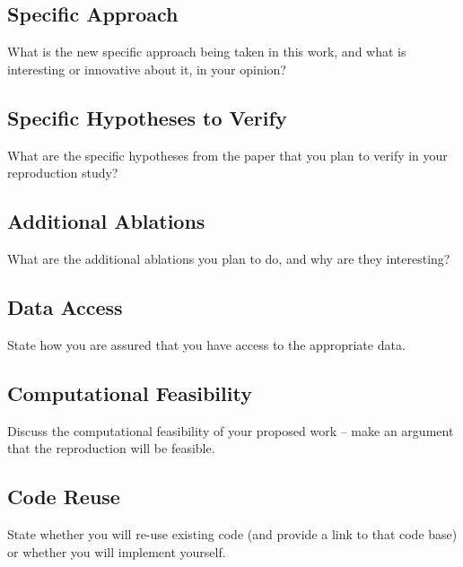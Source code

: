 \documentclass[11pt,a4paper]{article}
\begin{document}
\subsection{Specific Approach}
What is the new specific approach being taken in this work, and what is interesting or innovative about it, in your opinion?

\subsection{Specific Hypotheses to Verify}
What are the specific hypotheses from the paper that you plan to verify in your reproduction study?

\subsection{Additional Ablations}
What are the additional ablations you plan to do, and why are they interesting?

\subsection{Data Access}
State how you are assured that you have access to the appropriate data.

\subsection{Computational Feasibility}
Discuss the computational feasibility of your proposed work – make an argument that the reproduction will be feasible.

\subsection{Code Reuse}
State whether you will re-use existing code (and provide a link to that code base) or whether you will implement yourself.





\end{document}
